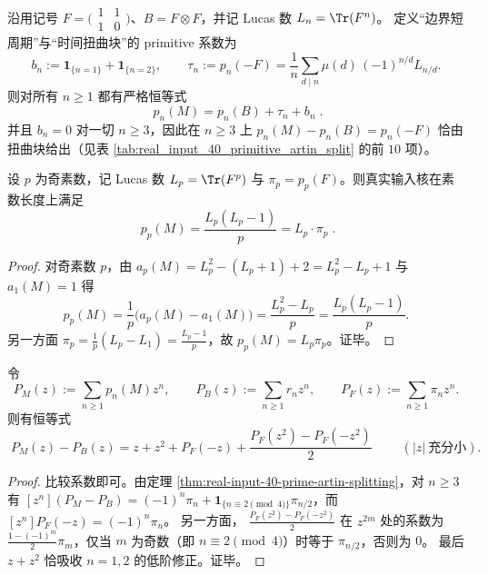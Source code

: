 \begin{corollary}\label{cor:real-input-40-space-twist-boundary-split}
沿用记号 \(F=\bigl(\begin{smallmatrix}1&1\\[2pt]1&0\end{smallmatrix}\bigr)\)、\(B=F\otimes F\)，并记 Lucas 数 \(L_n=\Tr(F^n)\)。
定义“边界短周期”与“时间扭曲块”的 primitive 系数为
\[
b_n:=\mathbf{1}_{\{n=1\}}+\mathbf{1}_{\{n=2\}},
\qquad
\tau_n:=p_n(-F)=\frac{1}{n}\sum_{d\mid n}\mu(d)\,(-1)^{n/d}L_{n/d}.
\]
则对所有 \(n\ge 1\) 都有严格恒等式
\[
\boxed{\; p_n(M)=p_n(B)+\tau_n+b_n\; }.
\]
并且 \(b_n=0\) 对一切 \(n\ge 3\)，因此在 \(n\ge 3\) 上
\(
p_n(M)-p_n(B)=p_n(-F)
\)
恰由扭曲块给出（见表 \ref{tab:real_input_40_primitive_artin_split} 的前 \(10\) 项）。
\end{corollary}

\begin{corollary}\label{cor:real-input-40-prime-length-product}
设 \(p\) 为奇素数，记 Lucas 数 \(L_p=\Tr(F^p)\) 与 \(\pi_p=p_p(F)\)。则真实输入核在素数长度上满足
\[
\boxed{\;
p_p(M)=\frac{L_p(L_p-1)}{p}=L_p\cdot \pi_p\; }.
\]
\end{corollary}
\begin{proof}
对奇素数 \(p\)，由 \(a_p(M)=L_p^2- (L_p+1)+2=L_p^2-L_p+1\) 与 \(a_1(M)=1\) 得
\[
p_p(M)=\frac{1}{p}\bigl(a_p(M)-a_1(M)\bigr)=\frac{L_p^2-L_p}{p}=\frac{L_p(L_p-1)}{p}.
\]
另一方面 \(\pi_p=\frac{1}{p}(L_p-L_1)=\frac{L_p-1}{p}\)，故 \(p_p(M)=L_p\pi_p\)。证毕。
\end{proof}

\begin{corollary}\label{cor:real-input-40-prime-genfun-identity}
令
\[
P_M(z):=\sum_{n\ge 1}p_n(M)z^n,\qquad
P_B(z):=\sum_{n\ge 1}r_n z^n,\qquad
P_F(z):=\sum_{n\ge 1}\pi_n z^n.
\]
则有恒等式
\[
\boxed{\;
P_M(z)-P_B(z)= z+z^2+P_F(-z)+\frac{P_F(z^2)-P_F(-z^2)}{2}\;}
\qquad(|z|\ \text{充分小}).
\]
\end{corollary}
\begin{proof}
比较系数即可。由定理 \ref{thm:real-input-40-prime-artin-splitting}，对 \(n\ge 3\) 有
\(
[z^n](P_M-P_B)=(-1)^n\pi_n+\mathbf{1}_{\{n\equiv 2\pmod 4\}}\pi_{n/2}
\)，而
\(
[z^n]P_F(-z)=(-1)^n\pi_n
\)。
另一方面，
\(
\frac{P_F(z^2)-P_F(-z^2)}{2}
\)
在 \(z^{2m}\) 处的系数为 \(\frac{1-(-1)^m}{2}\pi_m\)，仅当 \(m\) 为奇数（即 \(n\equiv 2\pmod 4\)）时等于 \(\pi_{n/2}\)，否则为 \(0\)。
最后 \(z+z^2\) 恰吸收 \(n=1,2\) 的低阶修正。证毕。
\end{proof}

